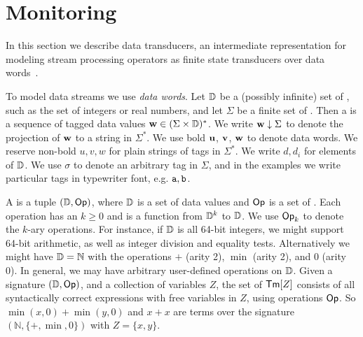 \section{Monitoring}
\label{sec:dt}


In this section we describe data transducers,
an intermediate representation for modeling
stream processing operators as finite state transducers
over data words~.


To model data streams we use \emph{data words}.
Let $\mathbb{D}$ be a (possibly infinite) set of ,
such as the set of integers or real numbers,
and let $\Sigma$ be a finite set of .
Then a  is a sequence of tagged data values
$\textbf{w} \in (\Sigma \times \mathbb{D})^*$.
We write $\textbf{w} \downarrow \Sigma$ to denote
the projection of $\textbf{w}$ to a string in $\Sigma^*$.
We use bold $\textbf{u}$, $\textbf{v}$, $\textbf{w}$ to denote data words.
We reserve non-bold $u, v, w$ for plain strings of tags in $\Sigma^*$.
We write $d, d_i$ for elements of $\mathbb{D}$.
We use $\sigma$ to denote an arbitrary tag in $\Sigma$,
and in the examples we write particular tags in typewriter font, e.g. $\texttt{a}, \texttt{b}$.

A  is a tuple $(\mathbb{D}, \textsf{Op})$,
where $\mathbb{D}$ is a set of data values
and $\textsf{Op}$ is a set of .
Each operation has an  $k \ge 0$
and is a function from $\mathbb{D}^k$ to $\mathbb{D}$.
We use $\textsf{Op}_k$ to denote the $k$-ary operations.
For instance, if $\mathbb{D}$ is all 64-bit integers, we might support 64-bit arithmetic, as well as
integer division and equality tests.
Alternatively we might have $\mathbb{D} = \mathbb{N}$
with the operations $+$ (arity 2), $\min$ (arity 2), and $0$ (arity 0).
In general, we may have arbitrary user-defined operations on $\mathbb{D}$.
Given a signature $(\mathbb{D}, \textsf{Op})$,
and a collection of variables $Z$,
the set of  $\textsf{Tm}[Z]$
consists of all syntactically correct expressions
with free variables in $Z$, using operations $\textsf{Op}$.
So $\min(x,0) + \min(y,0)$ and $x + x$
are terms over the signature $(\mathbb{N}, \{+,\min,0\})$ with $Z = \{x,y\}$.

